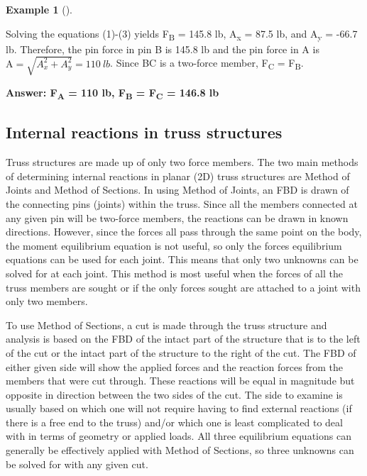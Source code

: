 \documentclass[
  letterpaper,
  DIV=11,
  numbers=noendperiod]{scrreprt}
\theoremstyle{definition}
\newtheorem{example}{Example}[chapter]
\theoremstyle{remark}
\begin{document}
\begin{tcolorbox}
\begin{example}[]
\begin{tcolorbox}
Solving the equations (1)-(3) yields F\textsubscript{B} = 145.8 lb,
A\textsubscript{x} = 87.5 lb, and A\textsubscript{y} = -66.7 lb.
Therefore, the pin force in pin B is 145.8 lb and the pin force in A is
\(\mathrm{A}=\sqrt{A_x^2+A_y^2}=110{~lb}\). Since BC is a two-force
member, F\textsubscript{C} = F\textsubscript{B}.

\textbf{Answer: F\textsubscript{A} = 110 lb, F\textsubscript{B} =
F\textsubscript{C} = 146.8 lb}

\end{tcolorbox}

\end{example}

\end{tcolorbox}

\subsection{Internal reactions in truss
structures}\label{internal-reactions-in-truss-structures}

Truss structures are made up of only two force members. The two main
methods of determining internal reactions in planar (2D) truss
structures are Method of Joints and Method of Sections. In using Method
of Joints, an FBD is drawn of the connecting pins (joints) within the
truss. Since all the members connected at any given pin will be
two-force members, the reactions can be drawn in known directions.
However, since the forces all pass through the same point on the body,
the moment equilibrium equation is not useful, so only the forces
equilibrium equations can be used for each joint. This means that only
two unknowns can be solved for at each joint. This method is most useful
when the forces of all the truss members are sought or if the only
forces sought are attached to a joint with only two members.

To use Method of Sections, a cut is made through the truss structure and
analysis is based on the FBD of the intact part of the structure that is
to the left of the cut or the intact part of the structure to the right
of the cut. The FBD of either given side will show the applied forces
and the reaction forces from the members that were cut through. These
reactions will be equal in magnitude but opposite in direction between
the two sides of the cut. The side to examine is usually based on which
one will not require having to find external reactions (if there is a
free end to the truss) and/or which one is least complicated to deal
with in terms of geometry or applied loads. All three equilibrium
equations can generally be effectively applied with Method of Sections,
so three unknowns can be solved for with any given cut.
\end{document}
